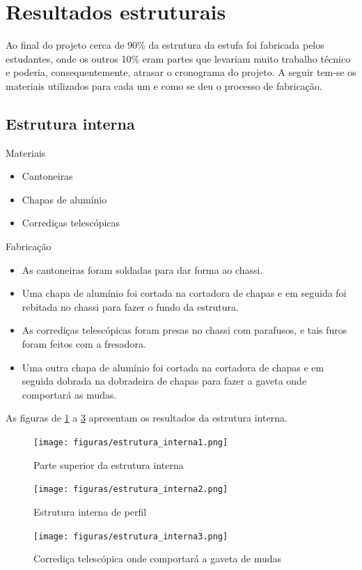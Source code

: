 \section{Resultados estruturais}

Ao final do projeto cerca de 90\% da estrutura da estufa foi fabricada pelos estudantes, onde os outros 10\% eram partes que levariam muito trabalho técnico e poderia, consequentemente, atrasar o cronograma do projeto. A seguir tem-se os materiais utilizados para cada um e como se deu o processo de fabricação.
\subsection{Estrutura interna}
Materiais
\begin{itemize}
	\item Cantoneiras
	\item Chapas de alumínio
	\item Corrediças telescópicas
\end{itemize}
Fabricação
\begin{itemize}
	\item As cantoneiras foram soldadas para dar forma ao chassi.
	\item Uma chapa de alumínio foi cortada na cortadora de chapas e em seguida foi rebitada no chassi para fazer o fundo da estrutura.
	\item As corrediças telescópicas foram presas no chassi com parafusos, e tais furos foram feitos com a fresadora.
	\item Uma outra chapa de alumínio foi cortada na cortadora de chapas e em seguida dobrada na dobradeira de chapas para fazer a gaveta onde comportará as mudas.
	
\end{itemize}

As figuras de \ref{fig:estrutura_interna1} a \ref{fig:estrutura_interna3} apresentam os resultados da estrutura interna.
\begin{figure}[H]
	\centering
	\texttt{[image: figuras/estrutura\_interna1.png]}
	\caption{Parte superior da estrutura interna}
	\label{fig:estrutura_interna1}
\end{figure}
\begin{figure}[H]
	\centering
	\texttt{[image: figuras/estrutura\_interna2.png]}
	\caption{Estrutura interna de perfil}
	\label{fig:estrutura_interna2}
\end{figure}
\begin{figure}[H]
	\centering
	\texttt{[image: figuras/estrutura\_interna3.png]}
	\caption{Corrediça telescópica onde comportará a gaveta de mudas}
	\label{fig:estrutura_interna3}
\end{figure}
